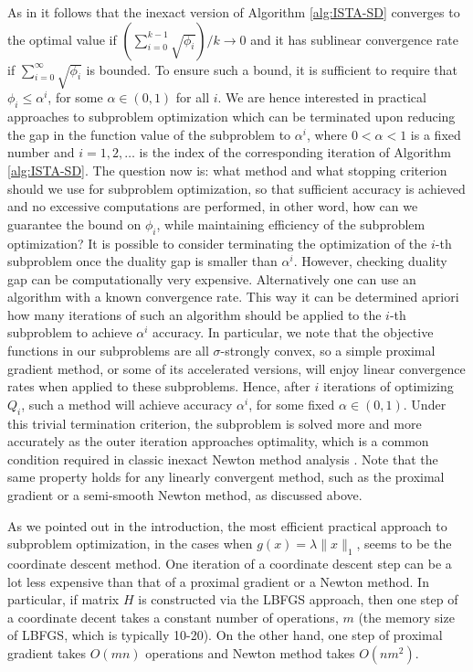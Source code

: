 \documentclass[11pt]{article}
\numberwithin{equation}{section}
\begin{document}
As in  \cite{Schmidtetal}  it follows that the inexact version of Algorithm \ref{alg:ISTA-SD} converges  to the optimal value if $(\sum_{i=0}^{k-1} \sqrt{\phi_i})/k \to 0$ and it has sublinear convergence rate if $\sum_{i=0}^{\infty} \sqrt{\phi_i}$ is  bounded.
To ensure such a  bound, it is sufficient to require that  $\phi_i\leq \alpha^i$, for some $\alpha\in (0,1)$ for all $i$. We are hence interested in practical approaches to subproblem optimization which can be terminated upon reducing the gap in the function value of the subproblem to $\alpha^i$, where $0<\alpha<1$ is a fixed number and  $i=1, 2, \ldots$ is the  index of the corresponding iteration of  Algorithm \ref{alg:ISTA-SD}. 
The question now is: what method and what stopping criterion should we use for subproblem optimization, so that sufficient accuracy is achieved and no excessive computations are performed, in other word, how can we guarantee the bound on $\phi_i$,  while maintaining efficiency of the subproblem optimization? It is possible to consider terminating
 the optimization of the $i$-th subproblem once the duality gap is smaller than $\alpha^i$.  However, checking duality gap can be computationally  very expensive. 
 Alternatively one can use an algorithm with a known  convergence rate. This way it can be determined apriori how many iterations of such an algorithm should be applied to the $i$-th subproblem to achieve $\alpha^i$ accuracy. In particular, we note that the objective functions in our subproblems  are all $\sigma$-strongly convex, so a simple proximal gradient method, or some of its accelerated versions,  will enjoy linear convergence rates when applied to these subproblems.  Hence, after $i$ iterations of optimizing
  $Q_i$,  such a method will achieve accuracy $\alpha^i$, for some fixed $\alpha\in (0,1)$.  Under this trivial termination criterion,  the subproblem is solved more and more accurately as the outer iteration approaches optimality, which is a common condition required in classic inexact Newton method analysis \cite{DemboEisenstatSteihaug1982}. 
Note that the same property holds for any linearly convergent  method, such as the proximal gradient or a semi-smooth Newton method, as discussed  above. 

As we pointed out in the introduction, the most efficient  practical approach to subproblem optimization, in the cases when  $g(x)=\lambda \|x\|_1$, seems to be the coordinate descent method. One iteration of a coordinate descent step can be a lot less expensive 
than that of a proximal gradient or a Newton method. In particular, if matrix $H$ is constructed via the LBFGS approach, then one step of a coordinate decent takes a constant number 
of operations, $m$ (the memory size of LBFGS, which is typically 10-20). On the other hand, one step of proximal gradient takes $O(mn)$ operations and Newton method takes $O(nm^2)$. 
\end{document}
